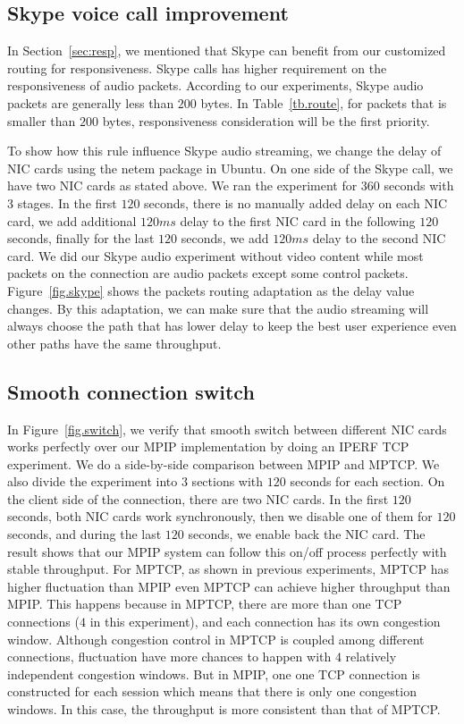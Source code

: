 \subsection{Skype voice call improvement}
\label{sec:skype}

In Section~\ref{sec:resp}, we mentioned that Skype can benefit from our customized routing for responsiveness. Skype calls has higher requirement on the responsiveness of audio packets. According to our experiments, Skype audio packets are generally less than $200$ bytes. In Table~\ref{tb.route}, for packets that is smaller than $200$ bytes, responsiveness consideration will be the first priority. 

To show how this rule influence Skype audio streaming, we change the delay of NIC cards using the netem package in Ubuntu. On one side of the Skype call, we have two NIC cards as stated above. We ran the experiment for $360$ seconds with $3$ stages. In the first $120$ seconds, there is no manually added delay on each NIC card, we add additional $120ms$ delay to the first NIC card in the following $120$ seconds, finally for the last $120$ seconds, we add $120ms$ delay to the second NIC card. We did our Skype audio experiment without video content while most packets on the connection are audio packets except some control packets. Figure~\ref{fig.skype} shows the packets routing adaptation as the delay value changes. By this adaptation, we can make sure that the audio streaming will always choose the path that has lower delay to keep the best user experience even other paths have the same throughput.


\subsection{Smooth connection switch}
\label{sec:switch}

In Figure~\ref{fig.switch}, we verify that smooth switch between different NIC cards works perfectly over our MPIP implementation by doing an IPERF TCP experiment. We do a side-by-side comparison between MPIP and MPTCP. We also divide the experiment into $3$ sections with $120$ seconds for each section. On the client side of the connection, there are two NIC cards. In the first $120$ seconds, both NIC cards work synchronously, then we disable one of them for $120$ seconds, and during the last $120$ seconds, we enable back the NIC card. The result shows that our MPIP system can follow this on/off process perfectly with stable throughput. For MPTCP, as shown in previous experiments, MPTCP has higher fluctuation than MPIP even MPTCP can achieve higher throughput than MPIP. This happens because in MPTCP, there are more than one TCP connections ($4$ in this experiment), and each connection has its own congestion window. Although congestion control in MPTCP is coupled among different connections, fluctuation have more chances to happen with $4$ relatively independent congestion windows. But in MPIP, one one TCP connection is constructed for each session which means that there is only one congestion windows. In this case, the throughput is more consistent than that of MPTCP.